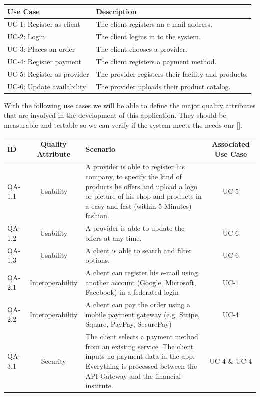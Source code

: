 \begin{table}[H]    
    \begin{tabularx}{\textwidth}{lX}
    \toprule
    Use Case & Description  \\
    \midrule
    UC-1: Register as \gls{client} & The \gls{client} registers an e-mail address.\\
    UC-2: Login & The \gls{client} logins in to the system. \\
    UC-3: Places an order & The \gls{client} chooses a \gls{provider}. \\
    UC-4: Register payment & The \gls{client} registers a payment method. \\
    UC-5: Register as \gls{provider} & The \gls{provider} registers their facility and products. \\
    UC-6: Update availability & The \gls{provider} uploads their product catalog. \\
    \bottomrule
    \end{tabularx}
\end{table}

With the following use cases we will  be able to define the major quality attributes that are involved in the 
development of this application. They should be measurable and testable so we can verify if the system meets 
the needs our  [\cite{refbook:DSHC}].

\begin{table}[H]
    \begin{tabularx}{\textwidth}{lcXc}
        \toprule
        ID & Quality Attribute & Scenario & Associated Use Case  \\
        \midrule
        QA-1.1 & Usability & A \gls{provider} is able to register his company, to specify the kind of products he offers 
        and upload a logo or picture of his shop and products in a easy and fast (within 5 Minutes) fashion. & UC-5 \\
        QA-1.2 & Usability & A \gls{provider} is able to update the offers at any time. &  UC-6 \\
        QA-1.3 & Usability & A \gls{client} is able to search and filter options. &  UC-6 \\
        QA-2.1 & Interoperability & A \gls{client} can register his e-mail using another account (Google, Microsoft, Facebook)
        in a \gls{federated login} & UC-1 \\
        QA-2.2 & Interoperability & A \gls{client} can pay the order using a \gls{mobile payment gateway} (e.g. Stripe, Square, PayPay, SecurePay) & UC-4 \\
        QA-3.1 & Security & The \gls{client} selects a payment method from an existing service. The client inputs no payment data 
        in the app. Everything is processed between the \gls{API Gateway} and the financial institute. & UC-4 \& UC-4 \\
        \bottomrule
    \end{tabularx}
\end{table}

